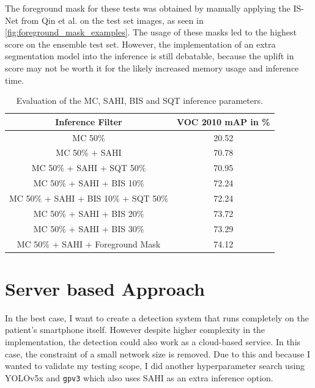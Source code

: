\documentclass[10pt]{book}
\newcommand{\figureref}[1]{\autoref{#1}}
\begin{document}
The foreground mask for these tests was obtained by manually applying the IS-Net from Qin et al. \cite{qin2022} on the test set images, as seen in \figureref{fig:foreground_mask_examples}. The usage of these masks led to the highest score on the ensemble test set. However, the implementation of an extra segmentation model into the inference is still debatable, because the uplift in score may not be worth it for the likely increased memory usage and inference time.

\begin{table}
  \begin{tabular}{ c c }
   Inference Filter & VOC 2010 \ac{mAP} in \% \\ 
   \hline
   \ac{MC} 50\% & 20.52 \\
   \ac{MC} 50\% + \ac{SAHI} & 70.78 \\
   \ac{MC} 50\% + \ac{SAHI} + \ac{SQT} 50\% & 70.95 \\
   \ac{MC} 50\% + \ac{SAHI} + \ac{BIS} 10\% & 72.24 \\
   \ac{MC} 50\% + \ac{SAHI} + \ac{BIS} 10\% + \ac{SQT} 50\% & 72.24 \\
   \ac{MC} 50\% + \ac{SAHI} + \ac{BIS} 20\% & 73.72 \\
   \ac{MC} 50\% + \ac{SAHI} + \ac{BIS} 30\% & 73.29 \\
   \ac{MC} 50\% + \ac{SAHI} + Foreground Mask & 74.12 \\
   \hline
  \end{tabular}
  \caption{\label{tab:inference_parameters}Evaluation of the \ac{MC}, \ac{SAHI}, \ac{BIS} and \ac{SQT} inference parameters.}
\end{table} %

\section{Server based Approach}

In the best case, I want to create a detection system that runs completely on the patient's smartphone itself. However despite higher complexity in the implementation, the detection could also work as a cloud-based service. In this case, the constraint of a small network size is removed. Due to this and because I wanted to validate my testing scope, I did another hyperparameter search using \ac{YOLO}v5x and \texttt{gpv3} which also uses \ac{SAHI} as an extra inference option.
\end{document}
